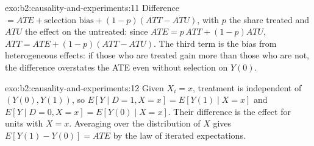 \begin{solution}{exo:b2:causality-and-experiments:11}
Difference $= \mathit{ATE} + \text{selection bias} + (1 - p)(\mathit{ATT} - \mathit{ATU})$, with $p$ the share treated and
$\mathit{ATU}$ the effect on the untreated: since $\mathit{ATE} = p\,\mathit{ATT} + (1 - p)\mathit{ATU}$, $\mathit{ATT} =
\mathit{ATE} + (1 - p)(\mathit{ATT} - \mathit{ATU})$. The third term is the bias from heterogeneous effects: if those who
are treated gain more than those who are not, the difference overstates the ATE even without selection on $Y(0)$.
\end{solution}

\begin{solution}{exo:b2:causality-and-experiments:12}
Given $X_i = x$, treatment is independent of $(Y(0), Y(1))$, so $E[Y \mid D = 1, X = x] = E[Y(1) \mid X = x]$ and $E[Y
\mid D = 0, X = x] = E[Y(0) \mid X = x]$. Their difference is the effect for units with $X = x$. Averaging over the
distribution of $X$ gives $E[Y(1) - Y(0)] = \mathit{ATE}$ by the law of iterated expectations.
\end{solution}

